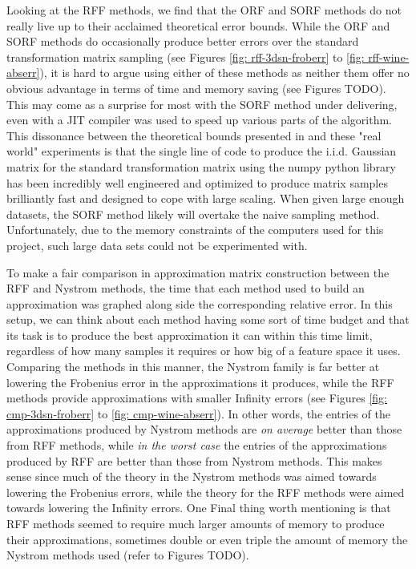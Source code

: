Looking at the RFF methods, we find that the ORF and SORF methods do not really live up to their acclaimed theoretical error bounds. While the ORF and SORF methods do occasionally produce better errors over the standard transformation matrix sampling (see Figures \ref{fig: rff-3dsn-froberr} to \ref{fig: rff-wine-abserr}), it is hard to argue using either of these methods as neither them offer no obvious advantage in terms of time and memory saving (see Figures TODO). This may come as a surprise for most with the SORF method under delivering, even with a JIT compiler was used to speed up various parts of the algorithm. This dissonance between the theoretical bounds presented in  and these "real world" experiments is that the single line of code to produce the i.i.d. Gaussian matrix for the standard transformation matrix using the numpy python library has been incredibly well engineered and optimized to produce matrix samples brilliantly fast and designed to cope with large scaling. When given large enough datasets, the SORF method likely will overtake the naive sampling method. Unfortunately, due to the memory constraints of the computers used for this project, such large data sets could not be experimented with.

To make a fair comparison in approximation matrix construction between the RFF and Nystrom methods, the time that each method used to build an approximation was graphed along side the corresponding relative error. In this setup, we can think about each method having some sort of time budget and that its task is to produce the best approximation it can within this time limit, regardless of how many samples it requires or how big of a feature space it uses. Comparing the methods in this manner, the Nystrom family is far better at lowering the Frobenius error in the approximations it produces, while the RFF methods provide approximations with smaller Infinity errors (see Figures \ref{fig: cmp-3dsn-froberr} to \ref{fig: cmp-wine-abserr}). In other words, the entries of the approximations produced by Nystrom methods are {\it on average} better than those from RFF methods, while {\it in the worst case} the entries of the approximations produced by RFF are better than those from Nystrom methods. This makes sense since much of the theory in the Nystrom methods was aimed towards lowering the Frobenius errors, while the theory for the RFF methods were aimed towards lowering the Infinity errors. One Final thing worth mentioning is that RFF methods seemed to require much larger amounts of memory to produce their approximations, sometimes double or even triple the amount of memory the Nystrom methods used (refer to Figures TODO).